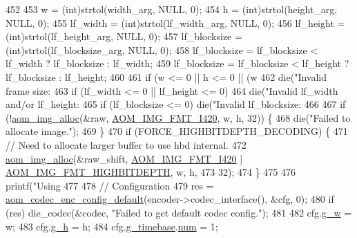 \begin{DoxyCodeInclude}
{{{{{{{{{{452 
453   w = (int)strtol(width\_arg, NULL, 0);
454   h = (int)strtol(height\_arg, NULL, 0);
455   lf\_width = (int)strtol(lf\_width\_arg, NULL, 0);
456   lf\_height = (int)strtol(lf\_height\_arg, NULL, 0);
457   lf\_blocksize = (int)strtol(lf\_blocksize\_arg, NULL, 0);
458   lf\_blocksize = lf\_blocksize < lf\_width ? lf\_blocksize : lf\_width;
459   lf\_blocksize = lf\_blocksize < lf\_height ? lf\_blocksize : lf\_height;
460 
461   \textcolor{keywordflow}{if} (w <= 0 || h <= 0 || (w %
462     die(\textcolor{stringliteral}{"Invalid frame size: %
463   \textcolor{keywordflow}{if} (lf\_width <= 0 || lf\_height <= 0)
464     die(\textcolor{stringliteral}{"Invalid lf\_width and/or lf\_height: %
465   \textcolor{keywordflow}{if} (lf\_blocksize <= 0) die(\textcolor{stringliteral}{"Invalid lf\_blocksize: %
466 
467   \textcolor{keywordflow}{if} (!\hyperlink{aom__image_8h_a570db29fbd122951235a08fe9375f6bb}{aom\_img\_alloc}(&raw, \hyperlink{aom__image_8h_a930317c04b4bd0a660bb5e744055523cabd778a3d697463e89d12a1117f417b60}{AOM\_IMG\_FMT\_I420}, w, h, 32)) \{
468     die(\textcolor{stringliteral}{"Failed to allocate image."});
469   \}
470   \textcolor{keywordflow}{if} (FORCE\_HIGHBITDEPTH\_DECODING) \{
471     \textcolor{comment}{// Need to allocate larger buffer to use hbd internal.}
472     \hyperlink{aom__image_8h_a570db29fbd122951235a08fe9375f6bb}{aom\_img\_alloc}(&raw\_shift, \hyperlink{aom__image_8h_a930317c04b4bd0a660bb5e744055523cabd778a3d697463e89d12a1117f417b60}{AOM\_IMG\_FMT\_I420} | 
      \hyperlink{aom__image_8h_a607b37d91f75442f54223ecd85f1b6cb}{AOM\_IMG\_FMT\_HIGHBITDEPTH}, w, h,
473                   32);
474   \}
475 
476   printf(\textcolor{stringliteral}{"Using %
477 
478   \textcolor{comment}{// Configuration}
479   res = \hyperlink{group__encoder_gabe456ab6f99bdebc47018779b75d2521}{aom\_codec\_enc\_config\_default}(encoder->codec\_interface(), &cfg, 0);
480   \textcolor{keywordflow}{if} (res) die\_codec(&codec, \textcolor{stringliteral}{"Failed to get default codec config."});
481 
482   cfg.\hyperlink{structaom__codec__enc__cfg_a80cb459c5ef3c7e1516f617c4c9d6eab}{g\_w} = w;
483   cfg.\hyperlink{structaom__codec__enc__cfg_a37b0f57b63bec8d133df8901d4407ee6}{g\_h} = h;
484   cfg.\hyperlink{structaom__codec__enc__cfg_a10664f1fc5b6ec29b77ee13efeeecdf7}{g\_timebase}.\hyperlink{structaom__rational_a7b48174411798c780a15f132c4650839}{num} = 1;
}}}}}}}}}}}}}}
\end{DoxyCodeInclude}

